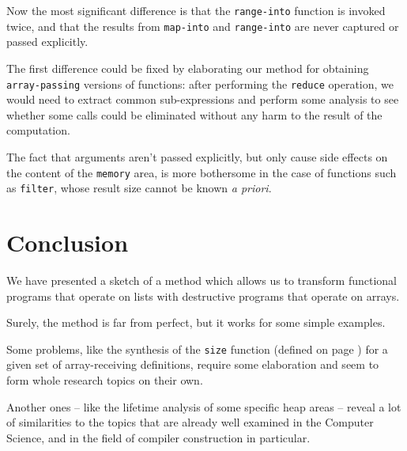 Now the most significant difference is that the \texttt{range-into} function
is invoked twice, and that the results from \texttt{map-into} and
\texttt{range-into} are never captured or passed explicitly.

The first difference could be fixed by elaborating our method for obtaining
\texttt{array-passing} versions of functions: after performing the
\texttt{reduce} operation, we would need to extract common sub-expressions
and perform some analysis to see whether some calls could be eliminated
without any harm to the result of the computation.

The fact that arguments aren't passed explicitly, but only cause side effects
on the content of the \texttt{memory} area, is more bothersome in the case of
functions such as \texttt{filter}, whose result size cannot be known \textit{a priori}.

\section{Conclusion}

We have presented a sketch of a method which allows us to transform
functional programs that operate on lists with destructive programs
that operate on arrays.

Surely, the method is far from perfect, but it works for some simple
examples.

Some problems, like the synthesis of the \texttt{size} function (defined
on page \pageref{size}) for a given set of array-receiving definitions,
require some elaboration and seem to form whole research topics on their
own.

Another ones -- like the lifetime analysis of some specific heap areas
-- reveal a lot of similarities to the topics that are already well examined
in the Computer Science, and in the field of compiler construction
in particular.






